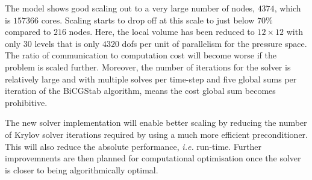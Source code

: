 \documentclass[review,times]{elsarticle}
\begin{document}
The model shows good scaling out to a very large number of nodes,
$4374$, which is $157366$ cores. Scaling starts to drop off at this
scale to just below $70\%$ compared to $216$ nodes. Here, the local
volume has been reduced to $12\times 12$ with only $30$ levels that is
only $4320$ dofs per unit of parallelism for the pressure space. The
ratio of communication to computation cost will become worse if the
problem is scaled further. Moreover, the number of iterations for the
solver is relatively large and with multiple solves per time-step and
five global sums per iteration of the BiCGStab algorithm, means the
cost global sum becomes prohibitive.

The new solver implementation will enable better scaling by reducing
the number of Krylov solver iterations required by using a much more
efficient preconditioner. This will also reduce the absolute
performance, {\em i.e.} run-time. Further improvemnents are then
planned for computational optimisation once the solver is closer to
being algorithmically
optimal.
\end{document}

